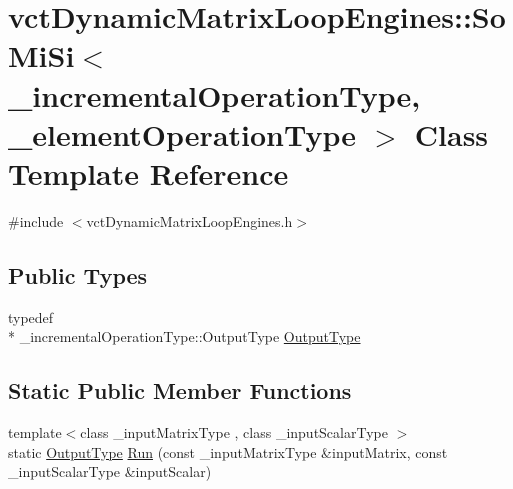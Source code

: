 \hypertarget{classvct_dynamic_matrix_loop_engines_1_1_so_mi_si}{\section{vct\-Dynamic\-Matrix\-Loop\-Engines\-:\-:So\-Mi\-Si$<$ \-\_\-incremental\-Operation\-Type, \-\_\-element\-Operation\-Type $>$ Class Template Reference}
\label{classvct_dynamic_matrix_loop_engines_1_1_so_mi_si}
}


{\ttfamily \#include $<$vct\-Dynamic\-Matrix\-Loop\-Engines.\-h$>$}

\subsection*{Public Types}
\begin{DoxyCompactItemize}
\item 
typedef \\*
\-\_\-incremental\-Operation\-Type\-::\-Output\-Type \hyperlink{classvct_dynamic_matrix_loop_engines_1_1_so_mi_si_a29a40c7dfb4677d1bea0a6014e3ed579}{Output\-Type}
\end{DoxyCompactItemize}
\subsection*{Static Public Member Functions}
\begin{DoxyCompactItemize}
\item 
{\footnotesize template$<$class \-\_\-input\-Matrix\-Type , class \-\_\-input\-Scalar\-Type $>$ }\\static \hyperlink{classvct_dynamic_matrix_loop_engines_1_1_so_mi_si_a29a40c7dfb4677d1bea0a6014e3ed579}{Output\-Type} \hyperlink{classvct_dynamic_matrix_loop_engines_1_1_so_mi_si_aadb7b5e5d593ca08b3bc58bff1d78c3a}{Run} (const \-\_\-input\-Matrix\-Type \&input\-Matrix, const \-\_\-input\-Scalar\-Type \&input\-Scalar)
\end{DoxyCompactItemize}


